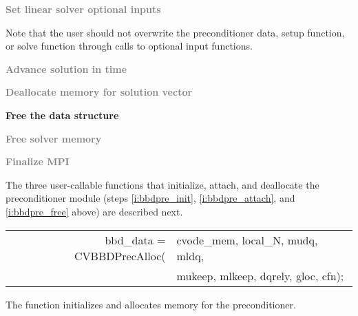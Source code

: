\begin{Steps}
\item
  \textcolor{gray}{\bf Set linear solver optional inputs}

  Note that the user should not overwrite the preconditioner data, setup function,
  or solve function through calls to {\cvspgmr} optional input functions.

\item
  \textcolor{gray}{\bf Advance solution in time}

\item
  \textcolor{gray}{\bf Deallocate memory for solution vector}

\item \label{i:bbdpre_free}
  {\bf Free the {\cvbbdpre} data structure}


\item
  \textcolor{gray}{\bf Free solver memory}
  
\item 
  \textcolor{gray}{\bf Finalize MPI}

\end{Steps}
The three user-callable functions that initialize, attach, and deallocate
the {\cvbbdpre} preconditioner module (steps \ref{i:bbdpre_init},
\ref{i:bbdpre_attach}, and \ref{i:bbdpre_free} above) are described
next.
{
   \begin{tabular}[t]{@{}r@{}l@{}}
     bbd\_data = CVBBDPrecAlloc(&cvode\_mem, local\_N, mudq, mldq, \\
                                &mukeep, mlkeep, dqrely, gloc, cfn);
   \end{tabular}
}
{
  The function  initializes and allocates
  memory for the {\cvbbdpre} preconditioner.
}
